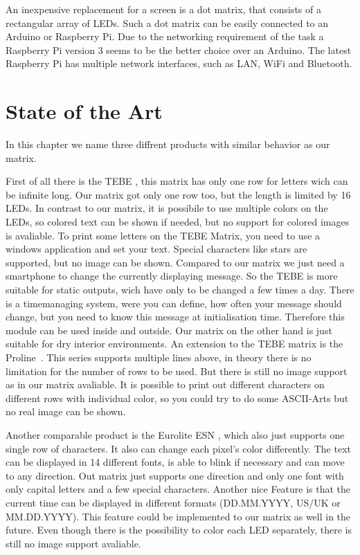 \documentclass[conference]{IEEEtran}
\begin{document}
An inexpensive replacement for a screen is a dot matrix, that consists of a rectangular array of LEDs. Such a dot matrix can be easily connected to an Arduino or Raspberry Pi. Due to the networking requirement of the task a Raspberry Pi version 3 seems to be the better choice over an Arduino. The latest Raspberry Pi has multiple network interfaces, such as LAN, WiFi and Bluetooth.


\section{State of the Art}
In this chapter we name three diffrent products with similar behavior as our matrix.

First of all there is the TEBE \cite{ledtebe}, this matrix has only one row for letters wich can be infinite long. Our matrix got only one row too, but the length is limited by 16 LEDs. In contrast to our matrix, it is possibile to use multiple colors on the LEDs, so colored text can be shown if needed, but no support for colored images is avaliable. To print some letters on the TEBE Matrix, you need to use a windows application and set your text. Special characters like stars are supported, but no image can be shown. Compared to our matrix we just need a smartphone to change the currently displaying message. So the TEBE is more suitable for static outputs, wich have only to be changed a few times a day. There is a timemanaging system, were you can define, how often your message should change, but you need to know this message at initialisation time. Therefore this module can be used inside and outside. Our matrix on the other hand is just suitable for dry interior environments. An extension to the TEBE matrix is the Proline~\cite{ledproline}. This series supports multiple lines above, in theory there is no limitation for the number of rows to be used. But there is still no image support as in our matrix avaliable. It is possible to print out different characters on different rows with individual color, so you could try to do some ASCII-Arts but no real image can be shown.

Another comparable product is the Eurolite ESN \cite{esn}, which also just supports one single row of characters. It also can change each pixel's color differently. The text can be displayed in 14 different fonts, is able to blink if necessary and can move to any direction. Out matrix just supports one direction and only one font with only capital letters and a few special characters. Another nice Feature is that the current time can be displayed in different formats (DD.MM.YYYY, US/UK or MM.DD.YYYY). This feature could be implemented to our matrix as well in the future. Even though there is the possibility to color each LED separately, there is still no image support avaliable.
\end{document}
